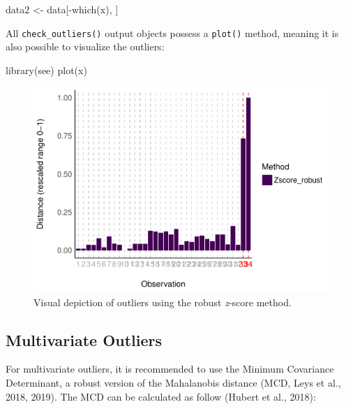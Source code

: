\documentclass[
]{article}
\newenvironment{Shaded}{\begin{snugshade}}{\end{snugshade}}
\newcommand{\FunctionTok}[1]{\textcolor[rgb]{0.00,0.00,0.00}{#1}}
\newcommand{\NormalTok}[1]{#1}
\newcommand{\OtherTok}[1]{\textcolor[rgb]{0.56,0.35,0.01}{#1}}
\newcommand{\SpecialCharTok}[1]{\textcolor[rgb]{0.00,0.00,0.00}{#1}}
\begin{document}
\begin{Shaded}
\begin{Highlighting}[]
\NormalTok{data2 }\OtherTok{\textless{}{-}}\NormalTok{ data[}\SpecialCharTok{{-}}\FunctionTok{which}\NormalTok{(x), ]}
\end{Highlighting}
\end{Shaded}

All \texttt{check\_outliers()} output objects possess a \texttt{plot()} method, meaning it is also possible to visualize the outliers:



\begin{Shaded}
\begin{Highlighting}[]
\FunctionTok{library}\NormalTok{(see)}
\FunctionTok{plot}\NormalTok{(x)}
\end{Highlighting}
\end{Shaded}

\begin{figure}
\includegraphics[width=1\linewidth]{paper_files/figure-latex/univariate-1} \caption{Visual depiction of outliers using the robust \emph{z}-score method.}\label{fig:univariate}
\end{figure}

\hypertarget{multivariate-outliers}{%
\subsection{Multivariate Outliers}\label{multivariate-outliers}}

For multivariate outliers, it is recommended to use the Minimum Covariance Determinant, a robust version of the Mahalanobis distance (MCD, Leys et al., 2018, 2019). The MCD can be calculated as follow (Hubert et al., 2018):
\end{document}
